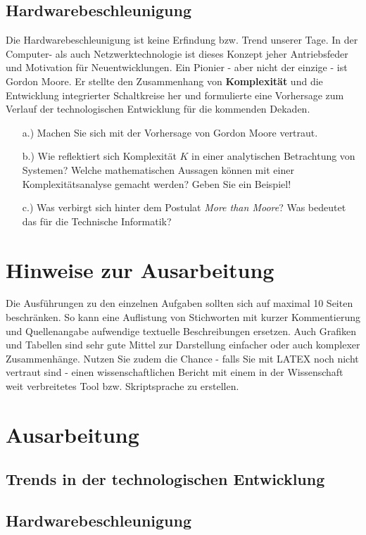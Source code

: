 \documentclass[addpoints,11pt]{exam}
\begin{document}
\subsection{Hardwarebeschleunigung}

Die Hardwarebeschleunigung ist keine Erfindung bzw. Trend unserer Tage. In der Computer- als auch Netzwerktechnologie ist dieses Konzept jeher Antriebsfeder und Motivation für Neuentwicklungen. Ein Pionier - aber nicht der einzige - ist Gordon Moore. Er stellte den Zusammenhang von  \textbf{Komplexität} und die Entwicklung integrierter Schaltkreise her und formulierte eine Vorhersage zum Verlauf der technologischen Entwicklung für die kommenden Dekaden. 

\begin{itemize}
		\item[a.)] Machen Sie sich mit der Vorhersage von Gordon Moore vertraut. 
		 \item[b.)] Wie reflektiert sich Komplexität $K$ in einer analytischen Betrachtung von Systemen? Welche mathematischen Aussagen können mit einer Komplexitätsanalyse gemacht werden? Geben Sie ein Beispiel!
		\item[c.)] Was verbirgt sich hinter dem Postulat \glqq \textit{More than Moore}\grqq? Was bedeutet das für die Technische Informatik? 
\end{itemize}

\section{Hinweise zur Ausarbeitung}

Die Ausführungen zu den einzelnen Aufgaben sollten sich auf maximal 10 Seiten beschränken. So kann eine Auflistung von Stichworten mit kurzer Kommentierung und Quellenangabe aufwendige textuelle Beschreibungen ersetzen. Auch Grafiken und Tabellen sind sehr gute Mittel zur Darstellung einfacher oder auch komplexer Zusammenhänge. 
Nutzen Sie zudem die Chance - falls Sie mit LATEX noch nicht vertraut sind - einen wissenschaftlichen Bericht mit einem in der Wissenschaft weit verbreitetes Tool bzw. Skriptsprache zu erstellen. 

\clearpage

\section{Ausarbeitung}


\subsection{Trends in der technologischen Entwicklung}


\subsection{Hardwarebeschleunigung}
\end{document}
